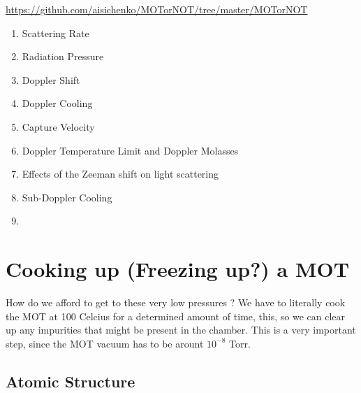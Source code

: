 \documentclass[10pt]{article}
\begin{document}
\url{https://github.com/aisichenko/MOTorNOT/tree/master/MOTorNOT}


\begin{enumerate}
    \item Scattering Rate
    \item Radiation Pressure
    \item Doppler Shift
    \item Doppler Cooling
    \item Capture Velocity
    \item Doppler Temperature Limit and Doppler Molasses
    \item Effects of the Zeeman shift on light scattering
    \item Sub-Doppler Cooling
    \item 
\end{enumerate}


\section*{Cooking up (Freezing up?) a MOT}
How do we afford to get to these very low pressures ? We have to literally cook the MOT at 100 Celcius for a determined amount of time, this, so we can clear up any impurities that might be present in the chamber. This is a very important step, since the MOT vacuum has to be arount $10^{-8}$ Torr.

\newpage
\subsection*{Atomic Structure}
\end{document}
